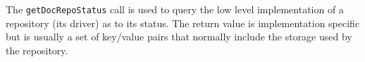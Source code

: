 The \verb+getDocRepoStatus+ call is used to query the low level implementation of a repository (its driver)
as to its status. The return value is implementation specific but is usually a set of key/value pairs that
normally include the storage used by the repository.
